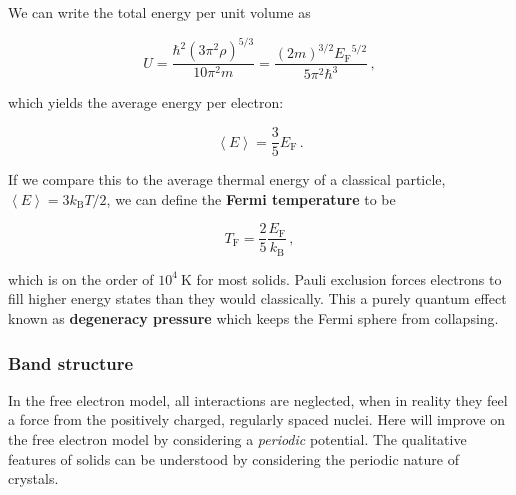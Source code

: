 \documentclass[12pt, titlepage]{article}
\newcommand{\exv}[1]{\left\langle #1 \right\rangle}
\begin{document}
We can write the total energy per unit volume as 

\begin{equation}
	U = \frac{\hbar^2(3\pi^2\rho)^{5/3}}{10\pi^2 m} = \frac{(2m)^{3/2}{E_\text{F}}^{5/2}}{5\pi^2\hbar^3} \,,
\end{equation}

which yields the average energy per electron:

\begin{equation}
	\exv{E} = \frac{3}{5}E_\text{F} \,.
\end{equation}

If we compare this to the average thermal energy of a classical particle, $\exv{E} = 3k_\text{B}T/2$, we can define the \textbf{Fermi temperature} to be 

\begin{equation}
	T_\text{F} = \frac{2}{5}\frac{E_\text{F}}{k_\text{B}} \,,
\end{equation}

which is on the order of $10^4~\si{\kelvin}$ for most solids. Pauli exclusion forces electrons to fill higher energy states than they would classically. This a purely quantum effect known as \textbf{degeneracy pressure} which keeps the Fermi sphere from collapsing.

\subsubsection{Band structure}
In the free electron model, all interactions are neglected, when in reality they feel a force from the positively charged, regularly spaced nuclei. Here will improve on the free electron model by considering a \textit{periodic} potential. The qualitative features of solids can be understood by considering the periodic nature of crystals.
\end{document}

